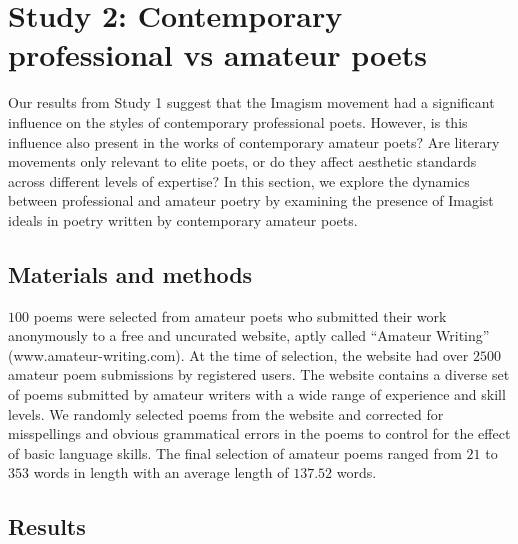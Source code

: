 \documentclass{book}
\begin{document}
\section{Study 2: Contemporary professional vs amateur poets}
Our results from Study 1 suggest that the Imagism movement had a significant influence on the styles of contemporary professional poets. However, is this influence also present in the works of contemporary amateur poets? Are literary movements only relevant to elite poets, or do they affect aesthetic standards across different levels of expertise? In this section, we explore the dynamics between professional and amateur poetry by examining the presence of Imagist ideals in poetry written by contemporary amateur poets. 

\subsection{Materials and methods}

$100$ poems were selected from amateur poets who submitted their work anonymously to a free and uncurated website, aptly called ``Amateur Writing'' (www.amateur-writing.com). At the time of selection, the website had over $2500$ amateur poem submissions by registered users. The website contains a diverse set of poems submitted by amateur writers with a wide range of experience and skill levels. We randomly selected poems from the website and corrected for misspellings and obvious grammatical errors in the poems to control for the effect of basic language skills. The final selection of amateur poems ranged from $21$ to $353$ words in length with an average length of $137.52$ words. 


\subsection{Results}
\end{document}
